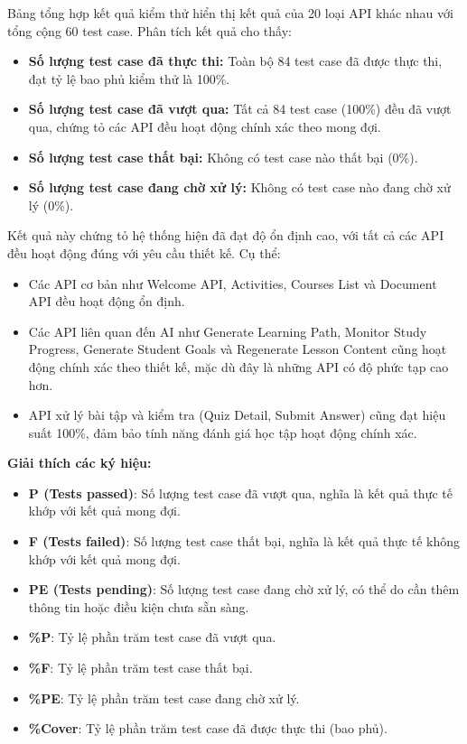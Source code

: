 Bảng tổng hợp kết quả kiểm thử hiển thị kết quả của 20 loại API khác nhau với tổng cộng 60 test case. Phân tích kết quả cho thấy:

\begin{itemize}
    \item \textbf{Số lượng test case đã thực thi:} Toàn bộ 84 test case đã được thực thi, đạt tỷ lệ bao phủ kiểm thử là 100\%.
    \item \textbf{Số lượng test case đã vượt qua:} Tất cả 84 test case (100\%) đều đã vượt qua, chứng tỏ các API đều hoạt động chính xác theo mong đợi.
    \item \textbf{Số lượng test case thất bại:} Không có test case nào thất bại (0\%).
    \item \textbf{Số lượng test case đang chờ xử lý:} Không có test case nào đang chờ xử lý (0\%).
\end{itemize}

Kết quả này chứng tỏ hệ thống hiện đã đạt độ ổn định cao, với tất cả các API đều hoạt động đúng với yêu cầu thiết kế. Cụ thể:

\begin{itemize}
    \item Các API cơ bản như Welcome API, Activities, Courses List và Document API đều hoạt động ổn định.
    \item Các API liên quan đến AI như Generate Learning Path, Monitor Study Progress, Generate Student Goals và Regenerate Lesson Content cũng hoạt động chính xác theo thiết kế, mặc dù đây là những API có độ phức tạp cao hơn.
    \item API xử lý bài tập và kiểm tra (Quiz Detail, Submit Answer) cũng đạt hiệu suất 100\%, đảm bảo tính năng đánh giá học tập hoạt động chính xác.
\end{itemize}

\textbf{Giải thích các ký hiệu:}
\begin{itemize}
    \item \textbf{P (Tests passed)}: Số lượng test case đã vượt qua, nghĩa là kết quả thực tế khớp với kết quả mong đợi.
    \item \textbf{F (Tests failed)}: Số lượng test case thất bại, nghĩa là kết quả thực tế không khớp với kết quả mong đợi.
    \item \textbf{PE (Tests pending)}: Số lượng test case đang chờ xử lý, có thể do cần thêm thông tin hoặc điều kiện chưa sẵn sàng.
    \item \textbf{\%P}: Tỷ lệ phần trăm test case đã vượt qua.
    \item \textbf{\%F}: Tỷ lệ phần trăm test case thất bại.
    \item \textbf{\%PE}: Tỷ lệ phần trăm test case đang chờ xử lý.
    \item \textbf{\%Cover}: Tỷ lệ phần trăm test case đã được thực thi (bao phủ).
\end{itemize}